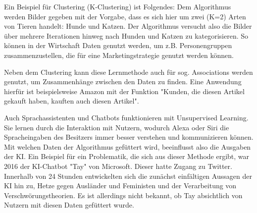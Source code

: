 \documentclass[a4paper,12pt, german]{report}
\begin{document}
Ein Beispiel für Clustering (K-Clustering) ist Folgendes: Dem Algorithmus werden Bilder gegeben mit der Vorgabe, dass es sich hier um zwei (K=2) Arten von Tieren handelt: Hunde und Katzen. Der Algorithmus versucht also die Bilder über mehrere Iterationen hinweg nach Hunden und Katzen zu kategorisieren. So können in der Wirtschaft Daten genutzt werden, um z.B. Personengruppen zusammenzustellen, die für eine Marketingstrategie genutzt werden können.

Neben dem Clustering kann diese Lernmethode auch für sog. Associations werden genutzt, um Zusammenhänge zwischen den Daten zu finden. Eine Anwendung hierfür ist beispielsweise Amazon mit der Funktion "Kunden, die diesen Artikel gekauft haben, kauften auch diesen Artikel".

Auch Sprachassistenten und Chatbots funktionieren mit Unsupervised Learning. Sie lernen durch die Interaktion mit Nutzern, wodurch Alexa oder Siri die Spracheingaben des Besitzers immer besser verstehen und kommunizieren können. Mit welchen Daten der Algorithmus gefüttert wird, beeinflusst also die Ausgaben der KI. Ein Beispiel für ein Problematik, die sich aus dieser Methode ergibt, war 2016 der KI-Chatbot "Tay" von Microsoft. Dieser hatte Zugang zu Twitter. Innerhalb von 24 Stunden entwickelten sich die zunächst einfältigen Aussagen der KI hin zu, Hetze gegen Ausländer und Feministen und der Verarbeitung von Verschwörungstheorien. Es ist allerdings nicht bekannt, ob Tay absichtlich von Nutzern mit diesen Daten gefüttert wurde. %
\end{document}
